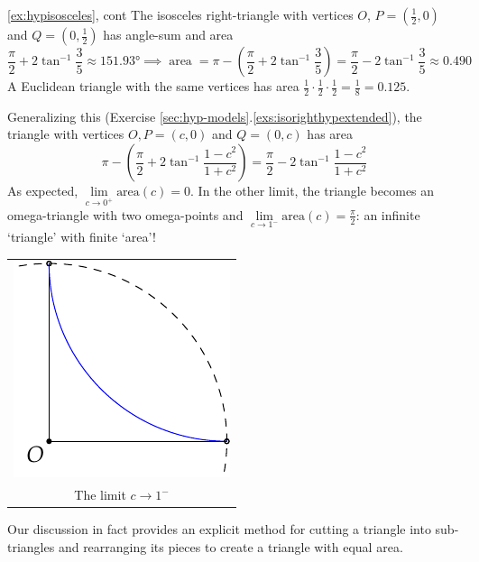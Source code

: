 \begin{example*}{\ref{ex:hypisosceles}, cont}{}
	The isosceles right-triangle with vertices $O$, $P=(\frac 12,0)$ and $Q=(0,\frac 12)$ has angle-sum and area
	\[
		\frac\pi 2+2\tan^{-1}\frac 35\approx \ang{151.93}\implies \operatorname{area}=\pi-\left(\frac\pi 2+2\tan^{-1}\frac 35\right) =\frac\pi 2-2\tan^{-1}\frac 35\approx 0.490
	\]
	A Euclidean triangle with the same vertices has area $\frac 12\cdot\frac 12\cdot\frac 12=\frac 18=0.125$.\par
	
	\begin{minipage}[t]{0.7\linewidth}\vspace{0pt}
		Generalizing this (Exercise \ref*{sec:hyp-models}.\ref{exs:isorighthypextended}), the triangle with vertices $O,P=(c,0)$ and $Q=(0,c)$ has area
		\[
			\pi-\left(\frac\pi 2+2\tan^{-1}\frac{1-c^2}{1+c^2}\right)=\frac\pi 2-2\tan^{-1}\frac{1-c^2}{1+c^2}
		\]
		As expected, $\lim\limits_{c\to 0^+}\text{area}(c)=0$. In the other limit, the triangle becomes an omega-triangle with two omega-points and $\lim\limits_{c\to 1^-}\text{area}(c)=\frac\pi 2$: an infinite `triangle' with finite `area'!
	\end{minipage}
	\hfill
	\begin{minipage}[t]{0.29\linewidth}\vspace{0pt}
		\flushright
		\begin{tabular}{c@{}}
			\includegraphics{area-iso}\\
			The limit $c\to 1^-$
		\end{tabular}
	\end{minipage}
\end{example*}\vfil

Our discussion in fact provides an explicit method for cutting a triangle into sub-triangles and rearranging its pieces to create a triangle with equal area.


